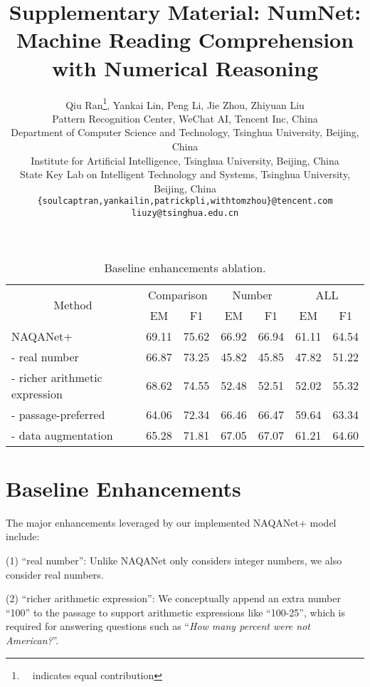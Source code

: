 \documentclass[11pt,a4paper]{article}
\title{Supplementary Material: NumNet: Machine Reading Comprehension with Numerical Reasoning}
\author{Qiu Ran\thanks{\ \ indicates equal contribution}, Yankai Lin\footnotemark[1], Peng Li, Jie Zhou, Zhiyuan Liu \\
  Pattern Recognition Center, WeChat AI, Tencent Inc, China \\
  Department of Computer Science and Technology, Tsinghua University, Beijing, China\\
Institute for Artificial Intelligence, Tsinghua University, Beijing, China\\
State Key Lab on Intelligent Technology and Systems, Tsinghua University, Beijing, China \\
  \texttt{\{soulcaptran,yankailin,patrickpli,withtomzhou\}@tencent.com}\\
  \texttt{liuzy@tsinghua.edu.cn}
}
\date{}
\begin{document}
\maketitle

\appendix
\begin{table*}[h!]
  \centering
  \small
  
  \begin{tabular}{lcccccc}
    \toprule
    \multicolumn{1}{c}{\multirow{2}{*}{Method}}  & \multicolumn{2}{c}{Comparison}        &\multicolumn{2}{c}{Number} & \multicolumn{2}{c}{ALL} \\
    \cmidrule(r){2-3}  \cmidrule(r){4-5} \cmidrule(r){6-7}
                                           & EM    & F1    & EM    & F1    & EM    & F1\\
    \midrule
    NAQANet+                               & 69.11 & 75.62 & 66.92 & 66.94 & 61.11 & 64.54\\
     - real number                  & 66.87 & 73.25 & 45.82 & 45.85 & 47.82 & 51.22\\
     - richer arithmetic expression & 68.62 & 74.55 & 52.48 & 52.51 & 52.02 & 55.32\\
    
     - passage-preferred            & 64.06 & 72.34 & 66.46 & 66.47 & 59.64 & 63.34\\
     - data augmentation            & 65.28 & 71.81 & 67.05 & 67.07 & 61.21 & 64.60\\
    \bottomrule
  \end{tabular}
  \caption{Baseline enhancements ablation.}
  \label{tab:tricks}
\end{table*}

\section{Baseline Enhancements}
\label{sec:tricks}

The major enhancements leveraged by our implemented NAQANet+ model
include:

(1) ``real number'': Unlike NAQANet only considers integer numbers, we also consider real numbers.

(2) ``richer arithmetic expression'': We conceptually append an extra number ``100'' to the passage to support arithmetic expressions like ``100-25'', which is required for answering questions such as ``\emph{How many percent were not American?}''.
\end{document}

